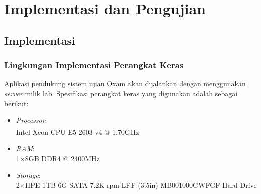 \chapter{Implementasi dan Pengujian}
\label{chap:implementasi-pengujian}

\section{Implementasi}

\subsection{Lingkungan Implementasi Perangkat Keras}
    Aplikasi pendukung sistem ujian Oxam akan dijalankan dengan menggunakan \textit{server} milik lab. 
    Spesifikasi perangkat keras yang digunakan adalah sebagai berikut:
    \begin{itemize}
        \item \textit{Processor}:\\ Intel\textsuperscript{\textregistered} Xeon\textsuperscript{\textregistered} CPU E5-2603 v4 @ 1.70GHz
        
        \item \textit{RAM}:\\ 1$\times$8GB DDR4 @ 2400MHz 
        
        \item \textit{Storage}:\\ 2$\times$HPE 1TB 6G SATA 
            7.2K rpm LFF (3.5in) MB001000GWFGF Hard Drive
    \end{itemize}
    
